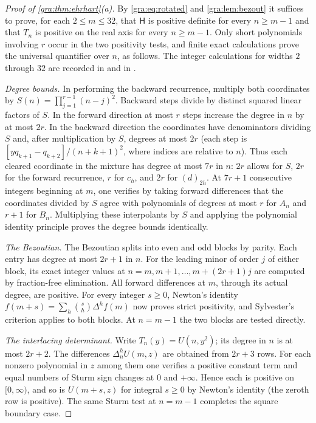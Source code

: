 \begin{proof}[Proof of \cref{gra:thm:ehrhart}\textup{(a)}]
By \eqref{gra:eq:rotated} and \cref{gra:lem:bezout} it suffices to prove,
for each $2\le m\le32$, that $\mathsf H$ is positive definite for every
$n\ge m-1$ and that $T_n$ is positive on the real axis for every
$n\ge m-1$. Only short polynomials involving $r$ occur in the two
positivity tests, and finite exact calculations prove the universal
quantifier over $n$, as follows. The integer calculations for widths $2$
through $32$ are recorded in
 and in
.

\emph{Degree bounds.} In performing the backward recurrence, multiply
both coordinates by $S(n)=\prod_{j=1}^{r-1}(n-j)^2$. Backward steps divide
by distinct squared linear factors of $S$. In the forward direction at
most $r$ steps increase the degree in $n$ by at most $2r$. In the backward
direction the coordinates have denominators dividing $S$ and, after
multiplication by $S$, degrees at most $2r$ (each step is
$[yq_{k+1}-q_{k+2}]/(n+k+1)^2$, where indices are relative to $n$). Thus
each cleared coordinate in the mixture has degree at most $7r$ in $n$:
$2r$ allows for $S$, $2r$ for the forward recurrence, $r$ for $c_h$, and
$2r$ for $(d)_{2h}$. At $7r+1$ consecutive integers beginning at $m$, one
verifies by taking forward differences that the coordinates divided by $S$
agree with polynomials of degrees at most $r$ for $A_n$ and $r+1$ for
$B_n$. Multiplying these interpolants by $S$ and applying the polynomial
identity principle proves the degree bounds identically.

\emph{The Bezoutian.} The Bezoutian splits into even and odd blocks by
parity. Each entry has degree at most $2r+1$ in $n$. For the leading minor
of order $j$ of either block, its exact integer values at
$n=m,m+1,\dots,m+(2r+1)j$ are computed by fraction-free elimination. All
forward differences at $m$, through its actual degree, are positive. For
every integer $s\ge0$, Newton's identity
$f(m+s)=\sum_h\binom sh\Delta^hf(m)$ now proves strict positivity, and
Sylvester's criterion applies to both blocks. At $n=m-1$ the two blocks
are tested directly.

\emph{The interlacing determinant.} Write $T_n(y)=U(n,y^2)$; its degree
in $n$ is at most $2r+2$. The differences $\Delta_n^hU(m,z)$ are obtained
from $2r+3$ rows. For each nonzero polynomial in $z$ among them one
verifies a positive constant term and equal numbers of Sturm sign changes
at $0$ and $+\infty$. Hence each is positive on $[0,\infty)$, and so is
$U(m+s,z)$ for integral $s\ge0$ by Newton's identity (the zeroth row is
positive). The same Sturm test at $n=m-1$ completes the square boundary
case.
\end{proof}

